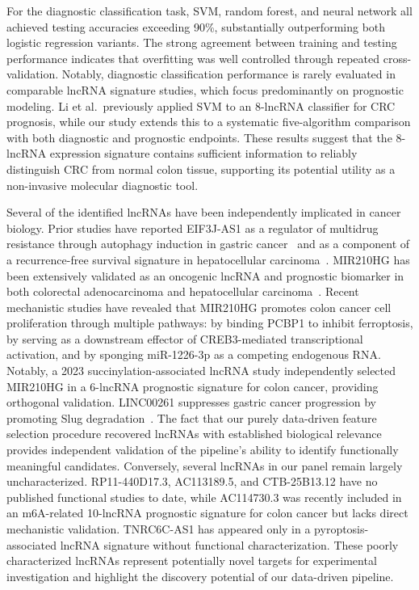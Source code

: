 \documentclass[12pt,a4paper]{article}
\begin{document}
For the diagnostic classification task, SVM, random forest, and neural network all achieved testing accuracies exceeding 90\%, substantially outperforming both logistic regression variants. The strong agreement between training and testing performance indicates that overfitting was well controlled through repeated cross-validation. Notably, diagnostic classification performance is rarely evaluated in comparable lncRNA signature studies, which focus predominantly on prognostic modeling. Li et al.\ previously applied SVM to an 8-lncRNA classifier for CRC prognosis, while our study extends this to a systematic five-algorithm comparison with both diagnostic and prognostic endpoints. These results suggest that the 8-lncRNA expression signature contains sufficient information to reliably distinguish CRC from normal colon tissue, supporting its potential utility as a non-invasive molecular diagnostic tool.

Several of the identified lncRNAs have been independently implicated in cancer biology. Prior studies have reported EIF3J-AS1 as a regulator of multidrug resistance through autophagy induction in gastric cancer~\cite{ref28} and as a component of a recurrence-free survival signature in hepatocellular carcinoma~\cite{ref29}. MIR210HG has been extensively validated as an oncogenic lncRNA and prognostic biomarker in both colorectal adenocarcinoma and hepatocellular carcinoma~\cite{ref30,ref31}. Recent mechanistic studies have revealed that MIR210HG promotes colon cancer cell proliferation through multiple pathways: by binding PCBP1 to inhibit ferroptosis, by serving as a downstream effector of CREB3-mediated transcriptional activation, and by sponging miR-1226-3p as a competing endogenous RNA. Notably, a 2023 succinylation-associated lncRNA study independently selected MIR210HG in a 6-lncRNA prognostic signature for colon cancer, providing orthogonal validation. LINC00261 suppresses gastric cancer progression by promoting Slug degradation~\cite{ref32}. The fact that our purely data-driven feature selection procedure recovered lncRNAs with established biological relevance provides independent validation of the pipeline's ability to identify functionally meaningful candidates. Conversely, several lncRNAs in our panel remain largely uncharacterized. RP11-440D17.3, AC113189.5, and CTB-25B13.12 have no published functional studies to date, while AC114730.3 was recently included in an m6A-related 10-lncRNA prognostic signature for colon cancer but lacks direct mechanistic validation. TNRC6C-AS1 has appeared only in a pyroptosis-associated lncRNA signature without functional characterization. These poorly characterized lncRNAs represent potentially novel targets for experimental investigation and highlight the discovery potential of our data-driven pipeline.
\end{document}
